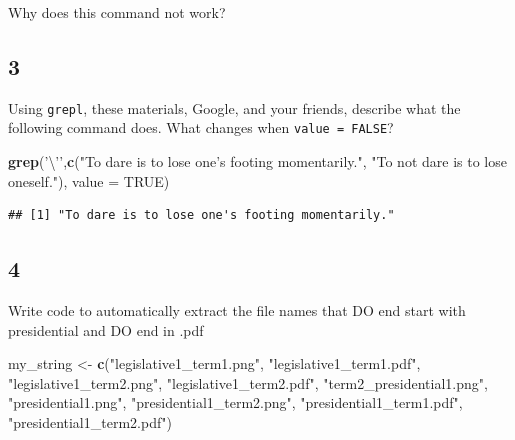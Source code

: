\documentclass[]{book}
\newenvironment{Shaded}{\begin{snugshade}}{\end{snugshade}}
\newcommand{\KeywordTok}[1]{\textcolor[rgb]{0.13,0.29,0.53}{\textbf{#1}}}
\newcommand{\DataTypeTok}[1]{\textcolor[rgb]{0.13,0.29,0.53}{#1}}
\newcommand{\CharTok}[1]{\textcolor[rgb]{0.31,0.60,0.02}{#1}}
\newcommand{\StringTok}[1]{\textcolor[rgb]{0.31,0.60,0.02}{#1}}
\newcommand{\OtherTok}[1]{\textcolor[rgb]{0.56,0.35,0.01}{#1}}
\newcommand{\NormalTok}[1]{#1}
\theoremstyle{definition}
\theoremstyle{definition}
\theoremstyle{definition}
\theoremstyle{remark}
\begin{document}
Why does this command not work?

\begin{Shaded}
\end{Shaded}

\subsection{3}\label{section-2}

Using \texttt{grepl}, these materials, Google, and your friends,
describe what the following command does. What changes when
\texttt{value\ =\ FALSE}?

\begin{Shaded}
\begin{Highlighting}[]
\KeywordTok{grep}\NormalTok{(}\StringTok{'}\CharTok{\textbackslash{}'}\StringTok{'}\NormalTok{,}\KeywordTok{c}\NormalTok{(}\StringTok{"To dare is to lose one's footing momentarily."}\NormalTok{, }
            \StringTok{"To not dare is to lose oneself."}\NormalTok{), }\DataTypeTok{value =} \OtherTok{TRUE}\NormalTok{)}
\end{Highlighting}
\end{Shaded}

\begin{verbatim}
## [1] "To dare is to lose one's footing momentarily."
\end{verbatim}

\subsection{4}\label{section-3}

Write code to automatically extract the file names that DO end start
with presidential and DO end in .pdf

\begin{Shaded}
\begin{Highlighting}[]
\NormalTok{my_string <-}\StringTok{ }\KeywordTok{c}\NormalTok{(}\StringTok{"legislative1_term1.png"}\NormalTok{, }\StringTok{"legislative1_term1.pdf"}\NormalTok{,}
               \StringTok{"legislative1_term2.png"}\NormalTok{, }\StringTok{"legislative1_term2.pdf"}\NormalTok{,}
               \StringTok{"term2_presidential1.png"}\NormalTok{, }
               \StringTok{"presidential1.png"}\NormalTok{, }\StringTok{"presidential1_term2.png"}\NormalTok{,}
               \StringTok{"presidential1_term1.pdf"}\NormalTok{, }\StringTok{"presidential1_term2.pdf"}\NormalTok{)}
\end{Highlighting}
\end{Shaded}
\end{document}
